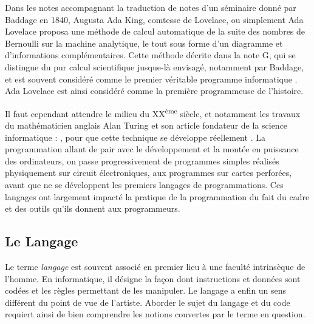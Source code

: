 \documentclass[12pt]{article} %
\newcommand{\ts}{\textsuperscript} %
\begin{document}
Dans les notes accompagnant la traduction de notes d'un séminaire donné par Baddage en 1840, Augusta Ada King, comtesse de Lovelace, ou simplement Ada Lovelace proposa une méthode de calcul automatique de la suite des nombres de Bernoulli sur la machine analytique, le tout sous forme d'un diagramme et d'informations complémentaires. Cette méthode décrite dans la note G, qui se distingue du pur calcul scientifique jusque-là envisagé, notamment par Baddage, et est souvent considéré comme le premier véritable programme informatique \cite{JKrysa}. Ada Lovelace est ainsi considéré comme la première programmeuse de l'histoire. 

Il faut cependant attendre le milieu du XX\ts{ème} siècle, et notamment les travaux du mathématicien anglais Alan Turing et son article fondateur de la science informatique : , pour que cette technique se développe réellement \cite{Turing1937-pn}. La programmation allant de pair avec le développement et la montée en puissance des ordinateurs, on passe progressivement de programmes simples réalisés physiquement sur circuit électroniques, aux programmes sur cartes perforées, avant que ne se développent les premiers langages de programmations. Ces langages ont largement impacté la pratique de la programmation du fait du cadre et des outils qu'ils donnent aux programmeurs.


\subsection{Le Langage}

Le terme \textit{langage} est souvent associé en premier lieu à une faculté intrinsèque de l'homme. En informatique, il désigne la façon dont instructions et données sont codées et les règles permettant de les manipuler. Le langage a enfin un sens différent du point de vue de l'artiste. Aborder le sujet du langage et du code requiert ainsi de bien comprendre les notions couvertes par le terme en question. 
\end{document}
